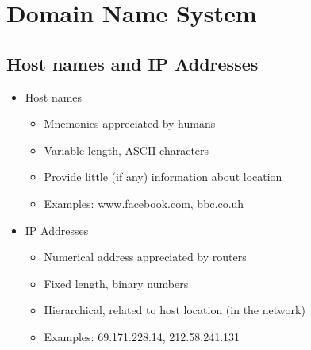 \section{Domain Name System}
\subsection{Host names and IP Addresses}
\begin{itemize}[nosep]
    \item Host names
          \begin{itemize}[nosep]
              \item Mnemonics appreciated by humans
              \item Variable length, ASCII characters
              \item Provide little (if any) information about location
              \item Examples: www.facebook.com, bbc.co.uh
          \end{itemize}
    \item IP Addresses
          \begin{itemize}[nosep]
              \item Numerical address appreciated by routers
              \item Fixed length, binary numbers
              \item Hierarchical, related to host location (in the network)
              \item Examples: 69.171.228.14, 212.58.241.131
          \end{itemize}
\end{itemize}
